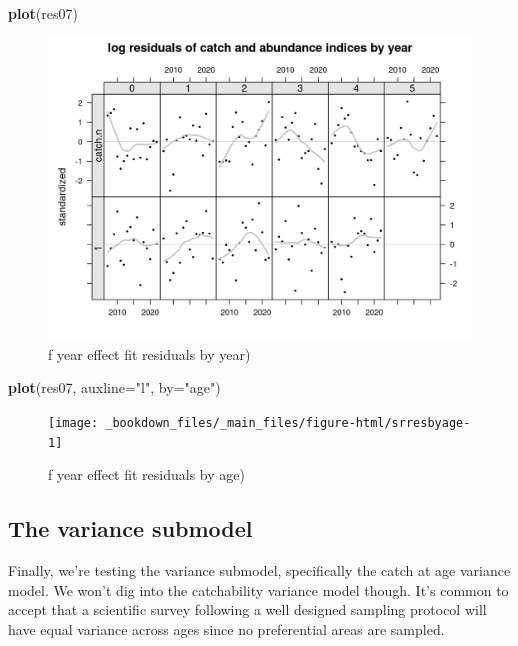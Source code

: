 \documentclass[
]{book}
\newenvironment{Shaded}{\begin{snugshade}}{\end{snugshade}}
\newcommand{\AttributeTok}[1]{\textcolor[rgb]{0.13,0.29,0.53}{#1}}
\newcommand{\FunctionTok}[1]{\textcolor[rgb]{0.13,0.29,0.53}{\textbf{#1}}}
\newcommand{\NormalTok}[1]{#1}
\newcommand{\StringTok}[1]{\textcolor[rgb]{0.31,0.60,0.02}{#1}}
\begin{document}
\begin{Shaded}
\begin{Highlighting}[]
\FunctionTok{plot}\NormalTok{(res07)}
\end{Highlighting}
\end{Shaded}

\begin{figure}
\centering
\includegraphics{_bookdown_files/_main_files/figure-html/srresbyyear-1.png}
\caption{\label{fig:srresbyyear}f year effect fit residuals by year)}
\end{figure}

\begin{Shaded}
\begin{Highlighting}[]
\FunctionTok{plot}\NormalTok{(res07, }\AttributeTok{auxline=}\StringTok{"l"}\NormalTok{, }\AttributeTok{by=}\StringTok{"age"}\NormalTok{)}
\end{Highlighting}
\end{Shaded}

\begin{figure}
\texttt{[image: \_bookdown\_files/\_main\_files/figure-html/srresbyage-1]} \caption{f year effect fit residuals by age)}\label{fig:srresbyage}
\end{figure}

\hypertarget{the-variance-submodel}{%
\subsection{The variance submodel}\label{the-variance-submodel}}

Finally, we're testing the variance submodel, specifically the catch at age variance model. We won't dig into the catchability variance model though. It's common to accept that a scientific survey following a well designed sampling protocol will have equal variance across ages since no preferential areas are sampled.
\end{document}
